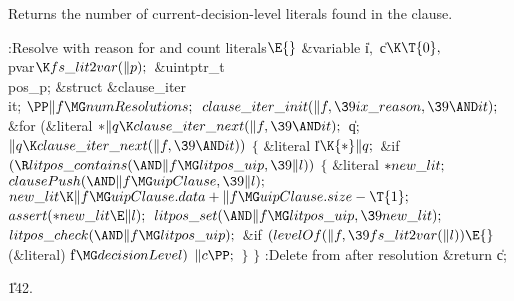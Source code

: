 Returns the number of current-decision-level literals found in the 
clause.

\Y\B\4:Resolve  with reason for  and
count literals\X${}\E{}$\6
\&{variable} \|i${},{}$ \|c${}\K\T{0},{}$ \\{pvar}${}\K\\{fs\_lit2var}(\|p);{}$%
\6
\&{uintptr\_t} \\{pos\_p};\6
\&{struct} \&{clause\_iter} \\{it};\7
${}\PP\|f\MG\\{numResolutions};{}$\6
${}\\{clause\_iter\_init}(\|f,\39\\{ix\_reason},\39{\AND}\\{it});{}$\6
\&{for} (\&{literal} ${}{*}\|q\K\\{clause\_iter\_next}(\|f,\39{\AND}\\{it});{}$
\|q; ${}\|q\K\\{clause\_iter\_next}(\|f,\39{\AND}\\{it})){}$\5
${}\{{}$\1\6
\&{literal} \|l${}\K{*}\|q;{}$\7
\&{if} ${}(\R\\{litpos\_contains}({\AND}\|f\MG\\{litpos\_uip},\39\|l)){}$\5
${}\{{}$\1\6
\&{literal} ${}{*}\\{new\_lit};{}$\7
${}\\{clausePush}({\AND}\|f\MG\\{uipClause},\39\|l);{}$\6
${}\\{new\_lit}\K\|f\MG\\{uipClause}.\\{data}+\|f\MG\\{uipClause}.\\{size}-%
\T{1};{}$\6
${}\\{assert}({*}\\{new\_lit}\E\|l);{}$\6
${}\\{litpos\_set}({\AND}\|f\MG\\{litpos\_uip},\39\\{new\_lit});{}$\6
${}\\{litpos\_check}({\AND}\|f\MG\\{litpos\_uip});{}$\6
\&{if} ${}(\\{levelOf}(\|f,\39\\{fs\_lit2var}(\|l))\E{}$(\&{literal}) \|f${}\MG%
\\{decisionLevel}){}$\1\5
${}\|c\PP;{}$\2\6
\4${}\}{}$\2\6
\4${}\}{}$\2\6
:Delete  from  after resolution\X\6
\&{return} \|c;\par
\U142.\fi

